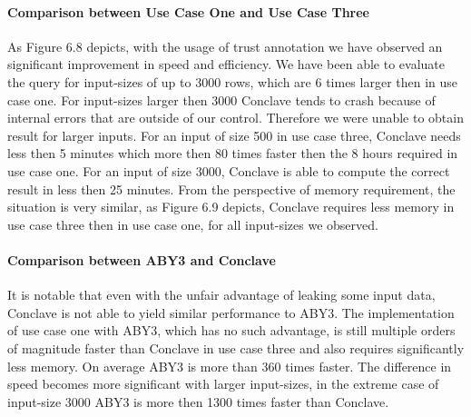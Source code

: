 \paragraph{Comparison between Use Case One and Use Case Three}
As Figure 6.8 depicts, with the usage of trust annotation we have observed an significant improvement in speed and efficiency. We have been able to evaluate the query for input-sizes of up to 3000 rows, which are 6 times larger then in use case one. For input-sizes larger then 3000 Conclave tends to crash because of internal errors that are outside of our control. Therefore we were unable to obtain result for larger inputs.  For an input of size 500 in use case three, Conclave needs less then 5 minutes which more then 80 times faster then the 8 hours required in use case one. For an input of size 3000, Conclave is able to compute the correct result in less then 25 minutes. From the perspective of memory requirement, the situation is very similar, as Figure 6.9 depicts, Conclave requires less memory in use case three then in use case one, for all input-sizes we observed. 

\paragraph{Comparison between ABY3 and Conclave}
It is notable that even with the unfair advantage of leaking some input data, Conclave is not able to yield similar performance to ABY3. The implementation of use case one with ABY3, which has no such advantage, is still multiple orders of magnitude faster than Conclave in use case three and also requires significantly less memory. On average ABY3 is more than 360 times faster. The difference in speed becomes more significant with larger input-sizes, in the extreme case of input-size 3000 ABY3 is more then 1300 times faster than Conclave. 


